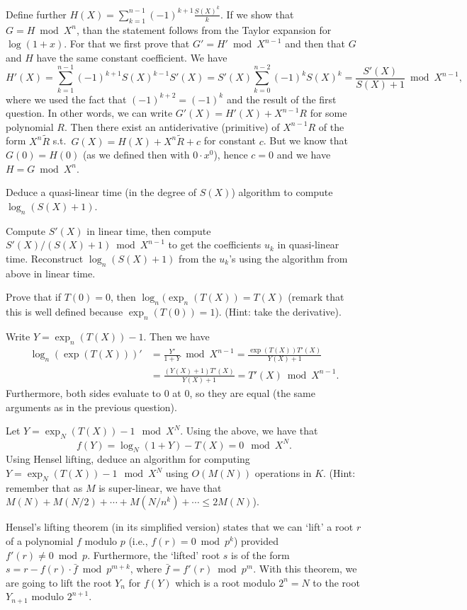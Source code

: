 \documentclass[11pt]{exam}
\theoremstyle{definition}
\begin{document}
\begin{questions}
\begin{solution}
	Define further $H(X) = \sum_{k = 1}^{n-1} (-1)^{k+1} \frac{S(X)^k}{k}$. If we show that $G=H \bmod X^n$, than the statement follows from the Taylor expansion for $\log (1+x)$. For that we first prove that $G' = H' \bmod X^{n-1}$ and then that $G$ and $H$ have the same constant coefficient. We have
	\[
		H'(X) = \sum_{k=1}^{n-1} (-1)^{k+1} S(X)^{k-1} S'(X) = S'(X) \sum_{k=0}^{n-2} (-1)^{k} S(X)^k = \frac{S'(X)}{S(X)+1} \bmod X^{n-1},
	\]
	where we used the fact that $(-1)^{k+2} = (-1)^k$ and the result of the first question. 
	In other words, we can write $G'(X) = H'(X) + X^{n-1} R$ for some polynomial $R$.
	Then there exist an antiderivative (primitive) of $X^{n-1}R$ of the form $X^n \tilde{R}$ s.t.\ $G(X) = H(X)+X^n \tilde{R}+c$ for constant $c$. But we know that $G(0)=H(0)$ (as we defined then with $0\cdot x^0$), hence $c=0$ and we have $H=G \bmod X^n$.
	\end{solution}
	\question Deduce a quasi-linear time (in the degree of $S(X)$) algorithm to compute $\log_n(S(X)+1)$.
	\begin{solution}
		Compute $S'(X)$ in linear time, then compute $S'(X)/(S(X)+1) \bmod X^{n-1}$ to get the coefficients $u_k$ in quasi-linear time. Reconstruct $\log_n(S(X)+1)$ from the $u_k$'s using the algorithm from above in linear time.
	\end{solution}
	\question Prove that if $T(0) = 0$, then $\log_n(\exp_n(T(X)) = T(X)$ (remark that this is well defined because $\exp_n(T(0)) = 1$). (Hint: take the derivative).
	\begin{solution}
		Write $Y=\exp_n(T(X))-1$. Then we have
		\begin{align*}
			\log_n(\exp(T(X)))' &= \frac{Y'}{1+Y} \bmod X^{n-1} = \frac{\exp(T(X)) T'(X)}{Y(X)+1} \\
			&=\frac{(Y(X)+1)T'(X)}{Y(X)+1} = T'(X) \bmod X^{n-1}.
		\end{align*}
		Furthermore, both sides evaluate to 0 at 0, so they are equal (the same arguments as in the previous question). 
	\end{solution}
	\question Let $Y = \exp_N(T(X))-1 \mod X^N$. Using the above, we have that
	$$f(Y) = \log_N(1+Y)-T(X) = 0 \mod X^N.$$
	Using Hensel lifting, deduce an algorithm for computing $Y = \exp_N(T(X))-1 \mod X^N$ using $O(M(N))$ operations in $K$. (Hint: remember that as $M$ is super-linear, we have that $M(N) + M(N/2) + \cdots + M(N/n^k) + \cdots \leq 2M(N)$).
	\begin{solution}
		Hensel's lifting theorem (in its simplified version) states that we can `lift' a root $r$ of a polynomial $f$ modulo $p$ (i.e., $f(r)=0 \bmod p^k $) provided $f'(r) \neq 0 \bmod p$. Furthermore, the `lifted' root $s$ is of the form $s=r-f(r) \cdot \bar{f} \bmod p^{m+k}$, where $\bar{f} = f'(r) \bmod p^m$.
		With this theorem, we are going to lift the root $Y_n$ for $f(Y)$ which is a root modulo $2^{n} = N$ to the root $Y_{n+1}$ modulo $2^{n+1}$. 
		

\end{solution}
\end{questions}
\end{document}
